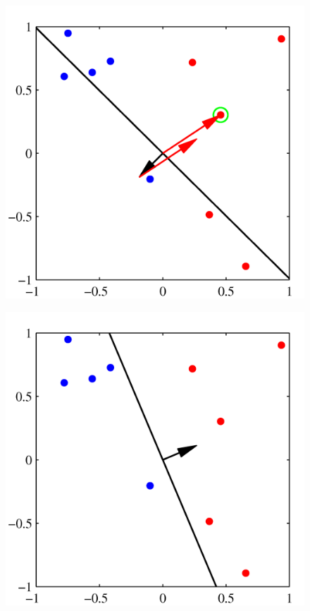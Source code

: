 \documentclass[b5paper]{book}
\numberwithin{equation}{chapter}
\begin{document}
{\begin{figure}[H]
\begin{minipage}[t]{0.5\linewidth}
		\label{fig:4-7b}
		\end{minipage} \\
		\begin{minipage}[t]{0.5\linewidth}
		\centering
		\includegraphics[scale=0.8]{Images/4-7c.png}
		\label{fig:4-7c}
		\end{minipage}
		\begin{minipage}[t]{0.5\linewidth}
		\centering
		\includegraphics[scale=0.8]{Images/4-7d.png}

\end{minipage}
\end{figure}}
\end{document}
